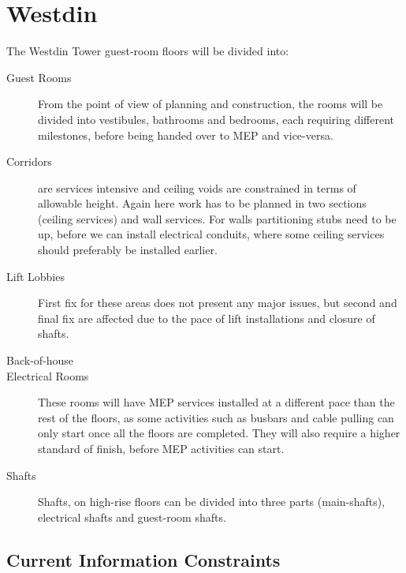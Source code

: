 
%
\chapter{Westdin}

The Westdin Tower guest-room floors will be divided into:

\begin{description}
\item[Guest Rooms] From the point of view of planning and construction, the rooms will be divided into vestibules, bathrooms and bedrooms, each requiring different milestones, before being handed over to MEP and vice-versa.
\item [Corridors] are services intensive and ceiling voids are constrained in terms of allowable height. Again here work has to be planned in two sections (ceiling services) and wall services. For walls partitioning stubs need to be up, before we can install electrical conduits, where some ceiling services should preferably be installed earlier.
\item [Lift Lobbies] First fix for these areas does not present any major issues, but second and final fix are affected due to the pace of lift installations and closure of shafts.
\item [Back-of-house]
\item [Electrical Rooms] These rooms will have MEP services installed at a different pace than the rest of the floors, as some activities such as busbars and cable pulling can only start once all the floors are completed. They will also require a higher standard of finish, before MEP activities can start.
\item [Shafts] Shafts, on high-rise floors can be divided into three parts (main-shafts), electrical shafts and guest-room shafts.
\end{description}


\section{Current Information Constraints}




